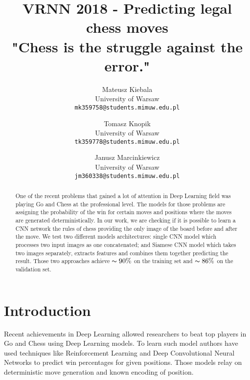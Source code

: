 \documentclass[10pt,twocolumn,letterpaper]{article}
\begin{document}
\title{VRNN 2018 - Predicting legal chess moves \\ \large {\small "Chess is the struggle against the error."} }


\author{Mateusz Kiebala\\
University of Warsaw\\
{\tt\small mk359758@students.mimuw.edu.pl}
\and
Tomasz Knopik\\
University of Warsaw\\
{\tt\small tk359778@students.mimuw.edu.pl}
\and
Janusz Marcinkiewicz\\
University of Warsaw\\
{\tt\small jm360338@students.mimuw.edu.pl}}

\maketitle

\begin{abstract}
   One of the recent problems that gained a lot of attention in Deep Learning
   field was playing Go and Chess at the professional level. The models for
   those problems are assigning the probability of the win for certain moves and
   positions where the moves are generated deterministically. In our work, we are
   checking if it is possible to learn a CNN network the rules of chess
   providing the only image of the board before and after the move. We test two
   different models architectures: single CNN model which processes two input
   images as one concatenated; and Siamese CNN model which takes two images
   separately, extracts features and combines them together predicting the
   result. Those two approaches achieve $\thicksim 90\%$ on the training set and
   $\thicksim 86\%$ on the validation set.
\end{abstract}

\section{Introduction}

Recent achievements in Deep Learning allowed researchers to beat top players in
Go and Chess using Deep Learning models\cite{silver2017mastering}. To learn such
model authors have used techniques like Reinforcement Learning and Deep
Convolutional Neural Networks to predict win percentages for given positions.
Those models relay on deterministic move generation and known encoding of
position.
\end{document}
